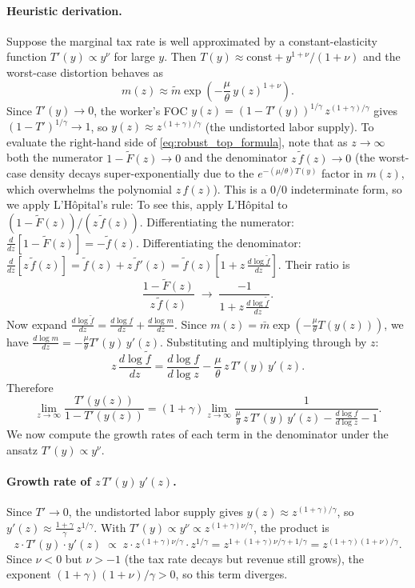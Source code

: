 \documentclass[12pt,a4paper]{article}
\theoremstyle{definition}
\theoremstyle{plain}
\theoremstyle{remark}
\begin{document}
\paragraph{Heuristic derivation.} Suppose the marginal tax rate is well approximated by a constant-elasticity function $T'(y) \propto y^\nu$ for large $y$. Then $T(y) \approx \text{const} + y^{1+\nu}/(1+\nu)$ and the worst-case distortion behaves as
\[
  m(z) \approx \widetilde{m}\exp\!\left(-\frac{\mu}{\theta}\, y(z)^{1+\nu}\right).
\]
Since $T'(y) \to 0$, the worker's FOC $y(z) = (1-T'(y))^{1/\gamma}\, z^{(1+\gamma)/\gamma}$ gives $(1-T')^{1/\gamma} \to 1$, so $y(z) \approx z^{(1+\gamma)/\gamma}$ (the undistorted labor supply). To evaluate the right-hand side of \eqref{eq:robust_top_formula}, note that as $z \to \infty$ both the numerator $1 - \widetilde{F}(z) \to 0$ and the denominator $z\,\widetilde{f}(z) \to 0$ (the worst-case density decays super-exponentially due to the $e^{-(\mu/\theta)T(y)}$ factor in $m(z)$, which overwhelms the polynomial $z\,f(z)$). This is a $0/0$ indeterminate form, so we apply L'H\^{o}pital's rule:
To see this, apply L'H\^{o}pital to $(1-\widetilde{F}(z))/(z\,\widetilde{f}(z))$. Differentiating the numerator: $\frac{d}{dz}[1-\widetilde{F}(z)] = -\widetilde{f}(z)$. Differentiating the denominator: $\frac{d}{dz}[z\,\widetilde{f}(z)] = \widetilde{f}(z) + z\,\widetilde{f}'(z) = \widetilde{f}(z)[1 + z\,\frac{d\log\widetilde{f}}{dz}]$. Their ratio is
\[
  \frac{1-\widetilde{F}(z)}{z\,\widetilde{f}(z)} \;\to\; \frac{-1}{1 + z\,\frac{d\log\widetilde{f}}{dz}}.
\]
Now expand $\frac{d\log\widetilde{f}}{dz} = \frac{d\log f}{dz} + \frac{d\log m}{dz}$. Since $m(z) = \bar{m}\exp(-\frac{\mu}{\theta}T(y(z)))$, we have $\frac{d\log m}{dz} = -\frac{\mu}{\theta}T'(y)\,y'(z)$. Substituting and multiplying through by $z$:
\[
  z\,\frac{d\log\widetilde{f}}{dz} = \frac{d\log f}{d\log z} - \frac{\mu}{\theta}\,z\,T'(y)\,y'(z).
\]
Therefore
\[
  \lim_{z \to \infty} \frac{T'(y(z))}{1-T'(y(z))}
  = (1+\gamma) \lim_{z \to \infty} \frac{1}{\frac{\mu}{\theta}\, z\, T'(y)\, y'(z) - \frac{d\log f}{d\log z} - 1}.
\]
We now compute the growth rates of each term in the denominator under the ansatz $T'(y) \propto y^\nu$.

\paragraph{Growth rate of $z\,T'(y)\,y'(z)$.}
Since $T' \to 0$, the undistorted labor supply gives $y(z) \approx z^{(1+\gamma)/\gamma}$, so $y'(z) \approx \frac{1+\gamma}{\gamma}\,z^{1/\gamma}$. With $T'(y) \propto y^\nu \propto z^{(1+\gamma)\nu/\gamma}$, the product is
\[
  z \cdot T'(y) \cdot y'(z) \;\propto\; z \cdot z^{(1+\gamma)\nu/\gamma} \cdot z^{1/\gamma} = z^{1 + (1+\gamma)\nu/\gamma + 1/\gamma} = z^{(1+\gamma)(1+\nu)/\gamma}.
\]
Since $\nu < 0$ but $\nu > -1$ (the tax rate decays but revenue still grows), the exponent $(1+\gamma)(1+\nu)/\gamma > 0$, so this term diverges.
\end{document}
